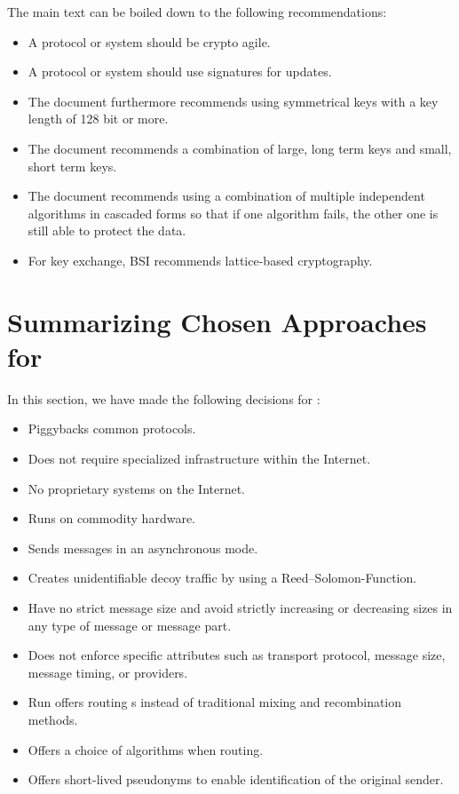 \begin{itemize}
	The main text can be boiled down to the following recommendations:
	\begin{itemize}
		\item A protocol or system should be crypto agile.
		\item A protocol or system should use signatures for updates.
		\item The document furthermore recommends using symmetrical keys with a key length of 128 bit or more.
		\item The document recommends a combination of large, long term keys and small, short term keys.
		\item The document recommends using a combination of multiple independent algorithms in cascaded forms so that if one algorithm fails, the other one is still able to protect the data.
		\item For key exchange, BSI recommends lattice-based cryptography.
	\end{itemize} 
\end{itemize}

\section{Summarizing Chosen Approaches for \MessageVortex}\label{sec:reqSummary}
In this section, we have made the following decisions for \MessageVortex:
\begin{itemize}
	\item Piggybacks common protocols.
	\item Does not require specialized infrastructure within the Internet.
	\item No proprietary systems on the Internet.
	\item Runs on commodity hardware.
	\item Sends messages in an asynchronous mode.
	\item Creates unidentifiable decoy traffic by using a Reed--Solomon-Function.
	\item Have no strict message size and avoid strictly increasing or decreasing sizes in any type of message or message part.
	\item Does not enforce specific attributes such as transport protocol, message size, message timing, or providers.
	\item Run offers routing s instead of traditional mixing and recombination methods.
	\item Offers a choice of algorithms when routing.
	\item Offers short-lived pseudonyms to enable identification of the original sender.
\end{itemize}

